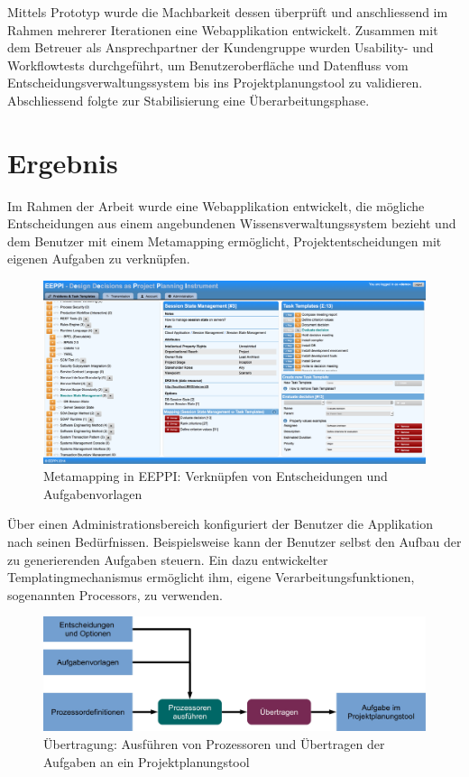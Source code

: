 	Mittels Prototyp wurde die Machbarkeit dessen überprüft
	und anschliessend im Rahmen mehrerer Iterationen eine Webapplikation entwickelt.
	Zusammen mit dem Betreuer als Ansprechpartner der Kundengruppe wurden Usability- und Workflowtests durchgeführt, um Benutzeroberfläche
	und Datenfluss vom Entscheidungsverwaltungssystem bis ins Projektplanungstool zu validieren.
	Abschliessend folgte zur Stabilisierung eine Überarbeitungsphase.
	
	
	\section{Ergebnis}
		
	Im Rahmen der Arbeit wurde eine Webapplikation entwickelt, 
	die mögliche Entscheidungen aus einem angebundenen Wissensverwaltungssystem bezieht
	und dem Benutzer mit einem Metamapping ermöglicht,
	Projektentscheidungen mit eigenen Aufgaben zu verknüpfen.	
	
	\begin{figure}[H]
		\includegraphics[width=\textwidth]{introduction/img/eeppiDecisionsAndTaskTemplates.png}
		\centering
		\caption{Metamapping in EEPPI: Verknüpfen von Entscheidungen und Aufgabenvorlagen}
		\label{fig:metamapping}
	\end{figure}	
	
	Über einen  Administrationsbereich konfiguriert der Benutzer die Applikation nach seinen Bedürfnissen.
	Beispielsweise kann der Benutzer selbst den Aufbau der zu generierenden Aufgaben steuern. 
	Ein dazu entwickelter Templatingmechanismus ermöglicht ihm, eigene Verarbeitungsfunktionen, sogenannten Processors, zu verwenden.
	
	\begin{figure}[H]
		\includegraphics[width=\textwidth]{introduction/img/simpleProcessWorkflow.jpg}
		\centering
		\caption{Übertragung: Ausführen von Prozessoren und Übertragen der Aufgaben an ein Projektplanungstool}
		\label{fig:metamapping}
	\end{figure}
	

